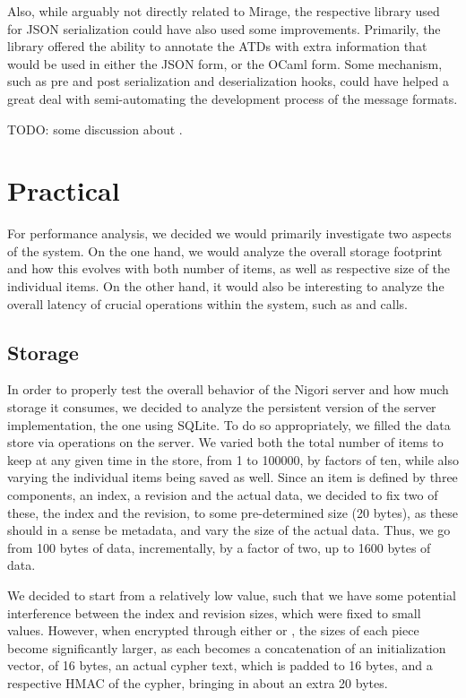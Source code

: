 Also, while arguably not directly related to Mirage, the respective library used for JSON serialization could have also used some improvements.
Primarily, the library offered the ability to annotate the ATDs with extra information that would be used in either the JSON form, or the OCaml form.
Some mechanism, such as pre and post serialization and deserialization hooks, could have helped a great deal with semi-automating the development process of the message formats.

TODO: some discussion about .

\section{Practical}
For performance analysis, we decided we would primarily investigate two aspects of the system.
On the one hand, we would analyze the overall storage footprint and how this evolves with both number of items, as well as respective size of the individual items.
On the other hand, it would also be interesting to analyze the overall latency of crucial operations within the system, such as  and  calls.

\subsection{Storage}
In order to properly test the overall behavior of the Nigori server and how much storage it consumes, we decided to analyze the persistent version of the server implementation, the one using SQLite.
To do so appropriately, we filled the data store via  operations on the server.
We varied both the total number of items to keep at any given time in the store, from 1 to 100000, by factors of ten, while also varying the individual items being saved as well.
Since an item is defined by three components, an index, a revision and the actual data, we decided to fix two of these, the index and the revision, to some pre-determined size (20 bytes), as these should in a sense be metadata, and vary the size of the actual data.
Thus, we go from 100 bytes of data, incrementally, by a factor of two, up to 1600 bytes of data.

We decided to start from a relatively low value, such that we have some potential interference between the index and revision sizes, which were fixed to small values.
However, when encrypted through either  or , the sizes of each piece become significantly larger, as each becomes a concatenation of an  initialization vector, of 16 bytes, an actual  cypher text, which is padded to 16 bytes, and a respective HMAC of the cypher, bringing in about an extra 20 bytes.

